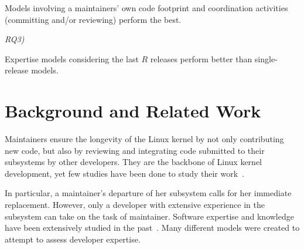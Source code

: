 \begin{myindentpar}{1cm}
Models involving a maintainers' own code footprint and coordination activities (committing and/or reviewing) perform the best.
\end{myindentpar}

\begin{description}
\item[\textit{RQ3)}] \textit{\rqthree }
\end{description}

\begin{myindentpar}{1cm}
Expertise models considering the last $R$ releases perform better than single-release models.
\end{myindentpar}

















\section{Background and Related Work}
\label{sec:backgr-relat-work} 


Maintainers ensure the longevity of the Linux kernel by not only contributing new code, but also by reviewing and integrating code submitted to their subsystems by other developers. They are the backbone of Linux kernel development, yet few studies have been done to study their work~\citep{Zhou-fse}.

In particular, a maintainer's departure of her subsystem calls for her immediate replacement. However, only a developer with extensive experience in the subsystem can take on the task of maintainer. Software expertise and knowledge have been extensively studied in the past~\citep{Bhattacharya, mockus02, McDonald, Fritz-2007}. Many different models were created to attempt to assess developer expertise. 

